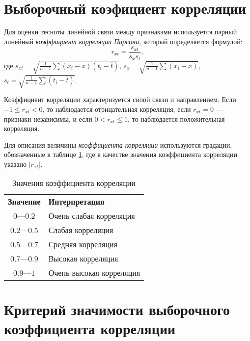 \section*{Выборочный коэфициент корреляции} %
\label{sec:correlation}

Для оценки тесноты линейной связи между признаками используется парный линейный \textit{коэффициент корреляции Пирсона}, который определяется формулой:
\begin{equation}
\label{eq:correlation}
	r_{xt} = \frac{s_{xt}}{s_x s_t},
\end{equation}
где $s_{xt} = \sqrt{\frac{1}{n - 1} \sum{(x_i - \overline{x})(t_i - \overline{t})}}$, $s_x = \sqrt{\frac{1}{n - 1} \sum{(x_i-\overline{x})}}$, $s_t = \sqrt{\frac{1}{n - 1} \sum{(t_i - \overline{t})}}$.

Коэффициент корреляции характеризуется силой связи и направлением. Если $-1 \le r_{xt} < 0$, то наблюдается отрицательная корреляция, если $r_{xt} = 0$ --- признаки независимы, и если $0 < r_{xt} \le 1$, то наблюдается положительная корреляция.

Для описания величины \textit{коэффициента корреляции} используются градации, обозначенные в таблице \ref{table:corr}, где в качестве значения коэффициента корреляции указано $\vert r_{xt} \vert$.
\begin{center}
\begin{table}[ht]
\label{table:corr}
	\caption{Значения коэффициента корреляции}
	\centering
	\begin{tabular}{c|l}
		\textbf{Значение} & \textbf{Интерпретация} \\
		$0$---$0.2$ & Очень слабая корреляция \\
		$0.2$---$0.5$ & Слабая корреляция \\
		$0.5$---$0.7$ & Средняя корреляция \\
		$0.7$---$0.9$ & Высокая корреляция \\
		$0.9$---$1$ & Очень высокая корреляция \\
	\end{tabular}
\end{table}
\end{center}

\section*{Критерий значимости выборочного коэффициента корреляции} %
\label{subsec:sign_corr}

